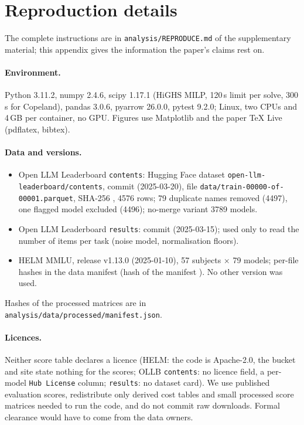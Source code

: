 \section{Reproduction details}
\label{app:repro}

The complete instructions are in \texttt{analysis/REPRODUCE.md} of the supplementary material; this appendix gives the information the paper's claims rest on.

\paragraph{Environment.} Python 3.11.2, numpy 2.4.6, scipy 1.17.1 (HiGHS MILP, 120\,s limit per solve, 300\,s for Copeland), pandas 3.0.6, pyarrow 26.0.0, pytest 9.2.0; Linux, two CPUs and 4\,GB per container, no GPU. Figures use Matplotlib and the paper TeX Live (pdflatex, bibtex).

\paragraph{Data and versions.}
\begin{itemize}
\item Open LLM Leaderboard \texttt{contents}: Hugging Face dataset \texttt{open-llm-leaderboard/contents}, commit \texttt{} (2025-03-20), file \texttt{data/train-00000-of-00001.parquet}, SHA-256 \texttt{}, 4576 rows; 79 duplicate names removed (4497), one flagged model excluded (4496); no-merge variant 3789 models.
\item Open LLM Leaderboard \texttt{results}: commit \texttt{} (2025-03-15); used only to read the number of items per task (noise model, normalisation floors).
\item HELM MMLU, release v1.13.0 (2025-01-10), 57 subjects $\times$ 79 models; per-file hashes in the data manifest (hash of the manifest \texttt{}). No other version was used.
\end{itemize}
Hashes of the processed matrices are in \texttt{analysis/data/processed/manifest.json}.

\paragraph{Licences.} Neither score table declares a licence (HELM: the code is Apache-2.0, the bucket and site state nothing for the scores; OLLB \texttt{contents}: no licence field, a per-model \texttt{Hub License} column; \texttt{results}: no dataset card). We use published evaluation scores, redistribute only derived cost tables and small processed score matrices needed to run the code, and do not commit raw downloads. Formal clearance would have to come from the data owners.

